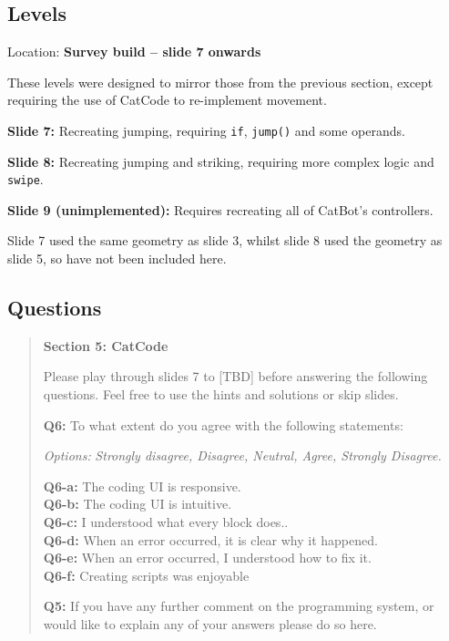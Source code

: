 \subsection{Levels}

Location: \textbf{Survey build -- slide 7 onwards}

These levels were designed to mirror those from the previous section, except requiring the use of CatCode to re-implement movement.

\textbf{Slide 7:} Recreating jumping, requiring \texttt{if}, \texttt{jump()} and some operands.

\textbf{Slide 8:} Recreating jumping and striking, requiring more complex logic and \texttt{swipe}.

\textbf{Slide 9 (unimplemented):} Requires recreating all of CatBot's controllers.

Slide 7 used the same geometry as slide 3, whilst slide 8 used the geometry as slide 5, so have not been included here.

\subsection{Questions}

\begin{fullwidth}
    \begin{quote}
        \textbf{Section 5: CatCode}
    
        Please play through slides 7 to [TBD] before answering the following questions. Feel free to use the hints and solutions or skip slides.

        \textbf{Q6:} To what extent do you agree with the following statements:

        \textit{Options:}
        \textit{Strongly disagree, Disagree, Neutral, Agree, Strongly Disagree.}

        \textbf{Q6-a:} The coding UI is responsive. \\
        \textbf{Q6-b:} The coding UI is intuitive. \\
        \textbf{Q6-c:} I understood what every block does.. \\
        \textbf{Q6-d:} When an error occurred, it is clear why it happened. \\
        \textbf{Q6-e:} When an error occurred, I understood how to fix it. \\
        \textbf{Q6-f:} Creating scripts was enjoyable

        \textbf{Q5:} If you have any further comment on the programming system, or would like to explain any of your answers please do so here.
    \end{quote}
\end{fullwidth}

